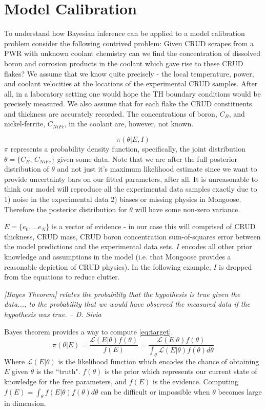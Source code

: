 \documentclass[10pt,a4paper]{report}
\begin{document}
\chapter{Model Calibration}

To understand how Bayesian inference can be applied to a model calibration problem consider the following contrived problem:  Given CRUD scrapes from a PWR with unknown coolant chemistry can we find the concentration of dissolved boron and corrosion products in the coolant which gave rise to these CRUD flakes?  We assume that we know quite precisely - the local temperature, power, and coolant velocities at the locations of the experimental CRUD samples. After all, in a laboratory setting one would hope the TH boundary conditions would be precisely measured.  We also assume that for each flake the CRUD constituents and thickness are accurately recorded.  The concentrations of boron, $C_{B}$, and nickel-ferrite,  $C_{NiFe}$, in the coolant are, however, not known.

\begin{equation}
\pi(\theta| E, I)
\label{eq:target}
\end{equation}
$\pi$ represents a probability density function, specifically, the joint distribution $\theta = \{C_{B}$, $C_{NiFe}\}$ given some data.  Note that we are after the full posterior distribution of $\theta$ and not just it's maximum likelihood estimate since we want to provide uncertainty bars on our fitted parameters, after all.  It is unreasonable to think our model will reproduce all the experimental data samples exactly due to 1) noise in the experimental data 2) biases or missing physics in Mongoose.  Therefore the posterior distribution for $\theta$ will have some non-zero variance.

$E=\{e_0, ... e_N\}$ is a vector of evidence - in our case this will comprised of CRUD thickness, CRUD mass, CRUD boron concentration sum-of-squares error between the model predictions and the experimental data sets. $I$ encodes all other prior knowledge and assumptions in the model (i.e. that Mongoose provides a reasonable depiction of CRUD physics).  In the following example, $I$ is dropped from the equations to reduce clutter.

\emph{[Bayes Theorem] relates the probability that the hypothesis is true given the data..., to the probability that we would have observed the measured data if the hypothesis was true. -- D. Sivia}

Bayes theorem provides a way to compute \ref{eq:target}.
\begin{equation}
    \pi(\theta| E) = \frac{\mathcal{L}(E|\theta)f(\theta)}{f(E)} = \frac{\mathcal{L}(E|\theta)f(\theta)}{\int_\theta \mathcal{L}(E|\theta) f(\theta)d\theta}
\end{equation}
Where $\mathcal{L}(E|\theta)$ is the likelihood function which encodes the chance of obtaining $E$ given $\theta$ is the ``truth". $f(\theta)$ is the prior which represents our current state of knowledge for the free parameters, and $f(E)$ is the evidence.
Computing $f(E)= \int_\theta f(E|\theta) f(\theta)d\theta$ can be difficult or impossible when $\theta$ becomes large in dimension.
\end{document}
